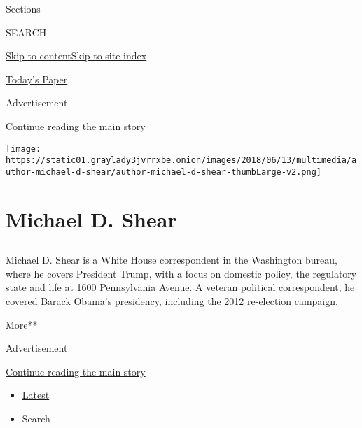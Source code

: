 Sections

SEARCH

\protect\hyperlink{site-content}{Skip to
content}\protect\hyperlink{site-index}{Skip to site index}

\href{https://myaccount.nytimes3xbfgragh.onion/auth/login?response_type=cookie\&client_id=vi}{}

\href{https://www.nytimes3xbfgragh.onion/section/todayspaper}{Today's
Paper}

Advertisement

\protect\hyperlink{after-top}{Continue reading the main story}

\texttt{[image: https://static01.graylady3jvrrxbe.onion/images/2018/06/13/multimedia/author-michael-d-shear/author-michael-d-shear-thumbLarge-v2.png]}

\hypertarget{michael-d-shear}{%
\section{Michael D. Shear}\label{michael-d-shear}}

\subsection{}

Michael D. Shear is a White House correspondent in the Washington
bureau, where he covers President Trump, with a focus on domestic
policy, the regulatory state and life at 1600 Pennsylvania Avenue. A
veteran political correspondent, he covered Barack Obama's presidency,
including the 2012 re-election campaign.

More**

Advertisement

\protect\hyperlink{after-mid1}{Continue reading the main story}

\begin{itemize}
\tightlist
\item
  \protect\hyperlink{stream-panel}{Latest}
\item
  Search
\end{itemize}

